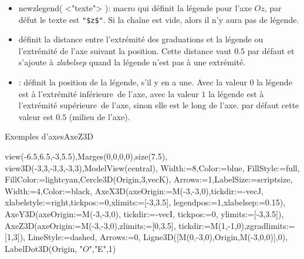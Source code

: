 \begin{itemize}
\begin{itemize}
  \item \textcolor{\coloropt}{newzlegend( <"texte"> )}: macro qui définit la légende pour l'axe $Oz$, par défut le texte est \verb|"$z$"|. Si la chaîne est vide, alors il n'y aura pas de légende.
  \item {} définit la distance entre l'extrémité des graduations et la légende ou l'extrémité de l'axe suivant la position. Cette distance vaut $0.5$ par défaut et s'ajoute à \textit{zlabelsep} quand la légende n'est pas à une extrémité.
  \item {}: définit la position de la légende, s'il y en a une. Avec la valeur $0$ la légende est à l'extrémité \og inférieure\fg\ de l'axe, avec la valeur $1$ la légende est à l'extrémité \og supérieure\fg\ de l'axe, sinon elle est le long de l'axe. par défaut cette valeur est $0.5$ (milieu de l'axe).
  \end{itemize}
\end{itemize}

\begin{demo}{Exemples d'axes}{AxeZ3D}
\begin{texgraph}[name=AxeZ3D]
view(-6.5,6.5,-3,5.5),Marges(0,0,0,0),size(7.5),
view3D(-3,3,-3,3,-3,3),ModelView(central),
Width:=8,Color:=blue, FillStyle:=full,
FillColor:=lightcyan,Cercle3D(Origin,3,vecK),
Arrows:=1,LabelSize:=scriptsize,
Width:=4,Color:=black,
AxeX3D(axeOrigin:=M(-3,-3,0),tickdir:=-vecJ,
   xlabelstyle:=right,tickpos:=0,xlimits:=[-3,3.5],
   legendpos:=1,xlabelsep:=0.15),
AxeY3D(axeOrigin:=M(-3,-3,0), tickdir:=-vecI,
    tickpos:=0, ylimits:=[-3,3.5]),
AxeZ3D(axeOrigin:=M(-3,-3,0),zlimits:=[0,3.5],
    tickdir:=M(1,-1,0),zgradlimits:=[1,3]),
LineStyle:=dashed, Arrows:=0,
Ligne3D([M(0,-3,0),Origin,M(-3,0,0)],0),
LabelDot3D(Origin, "$O$","E",1)
\end{texgraph}
\end{demo}




